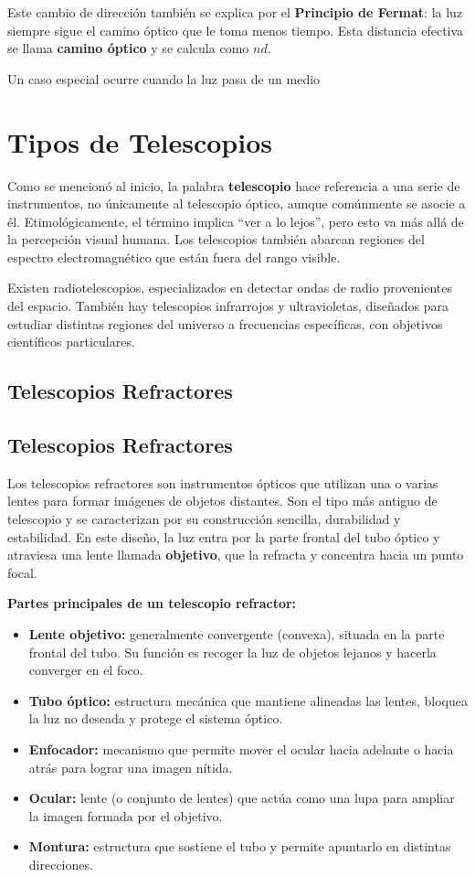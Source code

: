 Este cambio de dirección también se explica por el \textbf{Principio de Fermat}: la luz siempre sigue el camino óptico que le toma menos tiempo. Esta distancia efectiva se llama \textbf{camino óptico} y se calcula como $nd$.

Un caso especial ocurre cuando la luz pasa de un medio


\section{Tipos de Telescopios}

Como se mencionó al inicio, la palabra \textbf{telescopio} hace referencia a una serie de instrumentos, no únicamente al telescopio óptico, aunque comúnmente se asocie a él. Etimológicamente, el término implica “ver a lo lejos”, pero esto va más allá de la percepción visual humana. Los telescopios también abarcan regiones del espectro electromagnético que están fuera del rango visible.

Existen radiotelescopios, especializados en detectar ondas de radio provenientes del espacio. También hay telescopios infrarrojos y ultravioletas, diseñados para estudiar distintas regiones del universo a frecuencias específicas, con objetivos científicos particulares.

\subsection{Telescopios Refractores}

\subsection{Telescopios Refractores}

Los telescopios refractores son instrumentos ópticos que utilizan una o varias lentes para formar imágenes de objetos distantes. Son el tipo más antiguo de telescopio y se caracterizan por su construcción sencilla, durabilidad y estabilidad. En este diseño, la luz entra por la parte frontal del tubo óptico y atraviesa una lente llamada \textbf{objetivo}, que la refracta y concentra hacia un punto focal.

\textbf{Partes principales de un telescopio refractor:}
\begin{itemize}
	\item \textbf{Lente objetivo:} generalmente convergente (convexa), situada en la parte frontal del tubo. Su función es recoger la luz de objetos lejanos y hacerla converger en el foco.
	\item \textbf{Tubo óptico:} estructura mecánica que mantiene alineadas las lentes, bloquea la luz no deseada y protege el sistema óptico.
	\item \textbf{Enfocador:} mecanismo que permite mover el ocular hacia adelante o hacia atrás para lograr una imagen nítida.
	\item \textbf{Ocular:} lente (o conjunto de lentes) que actúa como una lupa para ampliar la imagen formada por el objetivo.
	\item \textbf{Montura:} estructura que sostiene el tubo y permite apuntarlo en distintas direcciones.
\end{itemize}

